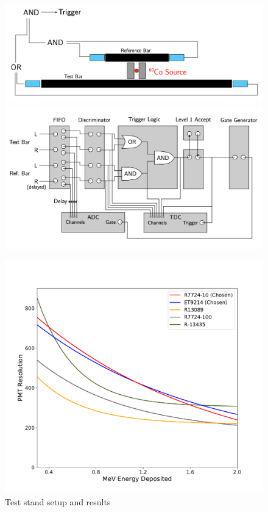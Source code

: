 \documentclass[review]{elsarticle}
\begin{document}
\begin{figure}[h!]
	\centering
	\begin{minipage}{0.48\textwidth}
		\includegraphics[width=\textwidth]{phys_setup.png} \\
		\includegraphics[width=\textwidth]{electr_setup.png}
	\end{minipage}
	\begin{minipage}{0.48\textwidth}
		\includegraphics[width=\textwidth]{test-stand/test-resolutions.pdf}
	\end{minipage}
	\caption{Test stand setup and results}
	\label{fig:test_stand}
\end{figure}
\end{document}
